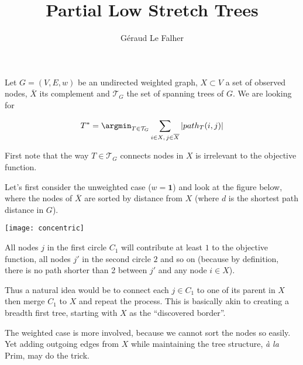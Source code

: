 \documentclass[a4paper,final,notitlepage,11pt,svgnames]{scrartcl}
\title{Partial Low Stretch Trees}
\author{Géraud Le Falher}
\newcommand{\stcomp}[1]{\ensuremath{\overline{#1}}}
\newcommand{\allst}{\ensuremath{\mathcal{T}_G}}
\newcommand{\objf}{objective function}
\begin{document}
\maketitle

Let $G=(V,E,w)$ be an undirected weighted graph, $X \subset V$ a set of observed
nodes, $\stcomp{X}$ its complement and \allst{} the set of spanning
trees of $G$. We are looking for

\begin{equation}
	\label{eq:prob}
	T^* = \argmin_{T \in \mathcal{T}_G} \sum_{i \in X ,\,j \in \stcomp{X}} \left|
		path_T(i, j) \right |
\end{equation}

First note that the way $T\in \allst$ connects nodes in $X$ is irrelevant to
the \objf{}.

Let's first consider the unweighted case ($w=\boldsymbol{1}$) and look at
the figure below, where the nodes of \stcomp{X} are sorted by distance
from $X$ (where $d$ is the shortest path distance in $G$).

\begin{center}
\texttt{[image: concentric]}
\end{center}

All nodes $j$ in the first circle $C_1$ will contribute at least $1$ to the \objf{},
all nodes $j'$ in the second circle $2$ and so on (because by definition, there
is no path shorter than 2 between $j'$ and any node $i \in X$).

Thus a natural idea would be to connect each $j \in C_1$ to one of its parent
in $X$ then merge $C_1$ to $X$ and repeat the process. This is basically akin
to creating a breadth first tree, starting with $X$ as the \enquote{discovered
border}.

The weighted case is more involved, because we cannot sort the nodes so easily.
Yet adding outgoing edges from $X$ while maintaining the tree structure,
\emph{à la} Prim, may do the trick.

\end{document}

